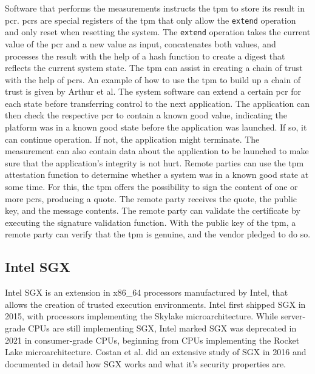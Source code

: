 Software that performs the measurements instructs the \gls{tpm} to store its
result in \gls{pcr}. \gls{pcr}s are special registers of the \gls{tpm} that only
allow the \texttt{extend} operation and only reset when resetting the system.
The \texttt{extend} operation takes the current value of the \gls{pcr} and a new
value as input, concatenates both values, and processes the result with the help
of a hash function to create a digest that reflects the current system state.
The \gls{tpm} can assist in creating a chain of trust with the help of
\gls{pcr}s. An example of how to use the \gls{tpm} to build up a chain of trust
is given by Arthur et al.\cite{arthur2015practical} The system software can
extend a certain \gls{pcr} for each state before transferring control to the
next application. The application can then check the respective \gls{pcr} to
contain a known good value, indicating the platform was in a known good state
before the application was launched. If so, it can continue operation. If not,
the application might terminate. The measurement can also contain data about the
application to be launched to make sure that the application's integrity is not
hurt. Remote parties can use the \gls{tpm} attestation function to determine
whether a system was in a known good state at some time. For this, the \gls{tpm}
offers the possibility to sign the content of one or more \gls{pcr}s, producing
a quote. The remote party receives the quote, the public key, and the message
contents. The remote party can validate the certificate by executing the
signature validation function. With the public key of the \gls{tpm}, a remote
party can verify that the \gls{tpm} is genuine, and the vendor pledged to do so.

\subsection{Intel SGX}
\label{sec:20:sgx}
Intel SGX is an extension in x86\_64 processors manufactured by Intel, that
allows the creation of trusted execution environments. Intel first shipped SGX
in 2015, with processors implementing the Skylake microarchitecture. While
server-grade CPUs are still implementing SGX, Intel marked SGX was deprecated in
2021 in consumer-grade CPUs, beginning from CPUs implementing the Rocket Lake
microarchitecture. Costan et al. did an extensive study of SGX in 2016 and
documented in detail how SGX works and what it's security properties
are.\cite{costan2016intel} \\


